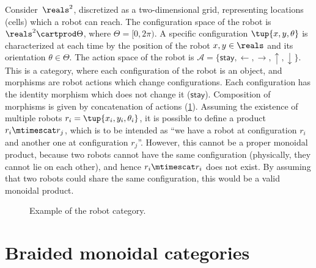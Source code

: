 \begin{example}
    \label{ex:robot}
    Consider~$\reals^2$, discretized as a two-dimensional grid, representing locations (cells) which a robot can reach.
    The configuration space of the robot is $\reals^2\cartprod \Theta$, where $\Theta=[0,2\pi)$.
    A specific configuration $\tup{x,y,\theta}$ is characterized at each time by the position of the robot $x,y\in \reals$ and its orientation $\theta \in \Theta$.
    The action space of the robot is $\mathcal{A}=\{\mathsf{stay},\leftarrow, \rightarrow, \uparrow, \downarrow\}$.
    This is a category, where each configuration of the robot is an object, and morphisms are robot actions which change configurations.
    Each configuration has the identity morphism which does not change it ($\mathsf{stay}$).
    Composition of morphisms is given by concatenation of actions (\cref{fig:robotcategory}).
    Assuming the existence of multiple robots $r_i=\tup{x_i,y_i,\theta_i}$, it is possible to define a product $r_i\mtimescat r_j$, which is to be intended as ``we have a robot at configuration $r_i$ and another one at configuration $r_j$''.
    However, this cannot be a proper monoidal product, because two robots cannot have the same configuration (physically, they cannot lie on each other), and hence $r_i\mtimescat r_i$ does not exist.
    By assuming that two robots could share the same configuration, this would be a valid monoidal product.
    \begin{figure}[tbh]
        \centering
        \caption{Example of the robot category. }
        \label{fig:robotcategory}
    \end{figure}
\end{example}


\section{Braided monoidal categories}


